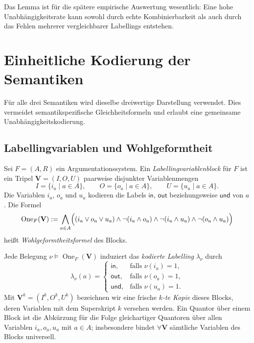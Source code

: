 Das Lemma ist für die spätere empirische Auswertung wesentlich: Eine hohe
Unabhängigkeitsrate kann sowohl durch echte Kombinierbarkeit als auch durch
das Fehlen mehrerer vergleichbarer Labellings entstehen.

\section{Einheitliche Kodierung der Semantiken}
\label{sec:uniform-semantics-encoding}

Für alle drei Semantiken wird dieselbe dreiwertige Darstellung verwendet.
Dies vermeidet semantikspezifische Gleichheitsformeln und erlaubt eine
gemeinsame Unabhängigkeitskodierung.

\subsection{Labellingvariablen und Wohlgeformtheit}

\begin{Definition}
    \label{def:labelling-variable-block}
    Sei \(F=(A,R)\) ein Argumentationssystem. Ein
    \emph{Labellingvariablenblock} für \(F\) ist ein Tripel
    \(\mathbf V=(I,O,U)\) paarweise disjunkter Variablenmengen
    \[
        I=\{i_a\mid a\in A\},
        \qquad
        O=\{o_a\mid a\in A\},
        \qquad
        U=\{u_a\mid a\in A\}.
    \]
    Die Variablen \(i_a\), \(o_a\) und \(u_a\) kodieren die Labels
    \(\mathsf{in}\), \(\mathsf{out}\) beziehungsweise \(\mathsf{und}\)
    von \(a\). Die Formel
    \[
        \operatorname{One}_F(\mathbf V)
        :=
        \bigwedge_{a\in A}
        \Bigl(
            (i_a\lor o_a\lor u_a)
            \land\neg(i_a\land o_a)
            \land\neg(i_a\land u_a)
            \land\neg(o_a\land u_a)
        \Bigr)
    \]
    heißt \emph{Wohlgeformtheitsformel} des Blocks.

    Jede Belegung \(\nu\models\operatorname{One}_F(\mathbf V)\)
    induziert das \emph{kodierte Labelling} \(\lambda_\nu\) durch
    \[
        \lambda_\nu(a)=
        \begin{cases}
            \mathsf{in},  &\text{falls }\nu(i_a)=1,\\
            \mathsf{out}, &\text{falls }\nu(o_a)=1,\\
            \mathsf{und}, &\text{falls }\nu(u_a)=1.
        \end{cases}
    \]
    Mit \(\mathbf V^k=(I^k,O^k,U^k)\) bezeichnen wir eine frische
    \emph{\(k\)-te Kopie} dieses Blocks, deren Variablen mit dem
    Superskript \(k\) versehen werden. Ein Quantor über einem Block ist
    die Abkürzung für die Folge gleichartiger Quantoren über allen
    Variablen \(i_a,o_a,u_a\) mit \(a\in A\); insbesondere bindet
    \(\forall\mathbf V\) sämtliche Variablen des Blocks universell.
\end{Definition}

